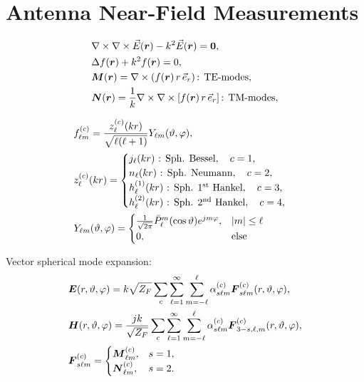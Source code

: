 \section{Antenna Near-Field Measurements}
\begin{align*}
  &\nabla \times \nabla \times \vec{E}(\boldsymbol{r}) - k^{2}\vec{E}(\boldsymbol{r}) = \boldsymbol{0},\\
  &\Delta f(\boldsymbol{r}) + k^{2}f(\boldsymbol{r}) = 0,\\
  &\boldsymbol{M}(\boldsymbol{r}) = \nabla \times \left(f(\boldsymbol{r}) \, r \, \vec{e}_{r}\right)\text{: TE-modes},\\
  &\boldsymbol{N}(\boldsymbol{r}) = \frac{1}{k} \nabla \times \nabla \times \left[f(\boldsymbol{r}) \, r \, \vec{e}_{r}\right]\text{: TM-modes},\\
\end{align*}

\begin{align*}
  &f_{\ell m}^{(c)} = \dfrac{z_{\ell}^{(c)}(kr)}{\sqrt{\ell (\ell + 1)}} Y_{\ell m}(\vartheta, \varphi),\\
  &z_{\ell}^{(c)}(kr) =
  \begin{cases}
    j_{\ell}(kr)\text{ : Sph. Bessel}, \quad c = 1,\\
    n_{\ell}(kr)\text{ : Sph. Neumann}, \quad c = 2,\\
    h_{\ell}^{(1)}(kr)\text{ : Sph. 1\textsuperscript{st} Hankel}, \quad c = 3,\\
    h_{\ell}^{(2)}(kr)\text{ : Sph. 2\textsuperscript{nd} Hankel}, \quad c = 4,
  \end{cases}\\
  &Y_{\ell m}(\vartheta,\varphi) =
  \begin{cases}
    \frac{1}{\sqrt{2\pi}} \bar{P}_{\ell}^{m}(\cos \vartheta) e^{jm\varphi}, &|m| \leq \ell\\
    0, &\text{else}
  \end{cases}
\end{align*}

Vector spherical mode expansion:
\begin{align*}
  &\boldsymbol{E}(r,\vartheta, \varphi) = k\sqrt{Z_{F}} \sum\limits_{c}\sum\limits_{\ell = 1}^{\infty}\sum\limits_{m=-\ell}^{\ell}\alpha_{s\ell m}^{(c)} \boldsymbol{F}_{s\ell m}^{(c)}(r,\vartheta,\varphi),\\
  &\boldsymbol{H}(r,\vartheta, \varphi) = \dfrac{jk}{\sqrt{Z_{F}}} \sum\limits_{c}\sum\limits_{\ell = 1}^{\infty}\sum\limits_{m=-\ell}^{\ell}\alpha_{s\ell m}^{(c)} \boldsymbol{F}_{3-s,\ell, m}^{(c)}(r,\vartheta,\varphi),\\
  &\boldsymbol{F}_{s\ell m}^{(c)} =
  \begin{cases}
    \boldsymbol{M}_{\ell m}^{(c)}, &s=1,\\
    \boldsymbol{N}_{\ell m}^{(c)}, &s=2.
  \end{cases}
\end{align*}

